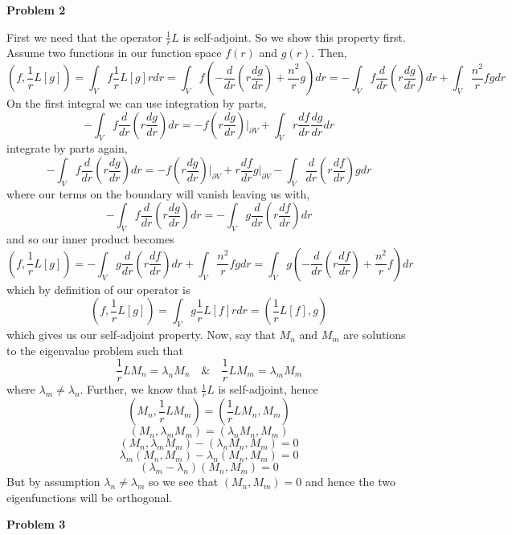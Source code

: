 \documentclass[10pt]{article}
\begin{document}
\newpage
\textbf{Problem 2}

First we need that the operator $\frac{1}{r}L$ is self-adjoint. So we show this property first. Assume two functions in our function space $f(r)$ and $g(r)$. Then,
$$\left(f,\frac{1}{r}L[g]\right) = \int_{V}f\frac{1}{r}L[g]r dr = \int_{V} f \left(-\frac{d}{dr}\left(r\frac{dg}{dr}\right) + \frac{n^{2}}{r}g\right)dr = -\int_{V}f\frac{d}{dr}\left(r\frac{dg}{dr}\right)dr + \int_{V}\frac{n^{2}}{r}fgdr$$
On the first integral we can use integration by parts,
$$-\int_{V}f\frac{d}{dr}\left(r\frac{dg}{dr}\right)dr = -f\left(r\frac{dg}{dr}\right)\biggr\rvert_{\partial V} + \int_{V}r\frac{df}{dr}\frac{dg}{dr}dr$$
integrate by parts again,
$$-\int_{V}f\frac{d}{dr}\left(r\frac{dg}{dr}\right)dr = -f\left(r\frac{dg}{dr}\right)\biggr\rvert_{\partial V} + r\frac{df}{dr}g\biggr\rvert_{\partial V} - \int_{V}\frac{d}{dr}\left(r\frac{df}{dr}\right)gdr$$
where our terms on the boundary will vanish leaving us with,
$$-\int_{V}f\frac{d}{dr}\left(r\frac{dg}{dr}\right)dr=- \int_{V}g\frac{d}{dr}\left(r\frac{df}{dr}\right)dr$$
and so our inner product becomes
$$\left(f,\frac{1}{r}L[g]\right) =-\int_{V}g\frac{d}{dr}\left(r\frac{df}{dr}\right)dr + \int_{V}\frac{n^{2}}{r}fgdr = \int_{V}g\left(-\frac{d}{dr}\left(r\frac{df}{dr}\right) + \frac{n^{2}}{r}f\right)dr$$
which by definition of our operator is
$$\left(f,\frac{1}{r}L[g]\right) = \int_{V}g\frac{1}{r}L[f]rdr = \left(\frac{1}{r}L[f],g\right)$$
which gives us our self-adjoint property. Now, say that $M_{n}$ and $M_{m}$ are solutions to the eigenvalue problem such that
$$\frac{1}{r}LM_{n} = \lambda_{n}M_{n} \hspace{1em} \& \hspace{1em} \frac{1}{r}LM_{m} = \lambda_{m}M_{m}$$
where $\lambda_{m} \neq \lambda_{n}$. Further, we know that $\frac{1}{r}L$ is self-adjoint, hence
$$\left(M_{n},\frac{1}{r}LM_{m}\right) = \left(\frac{1}{r}LM_{n},M_{m}\right)$$
$$\left(M_{n},\lambda_{m}M_{m}\right) = \left(\lambda_{n}M_{n},M_{m}\right)$$
$$(M_{n}, \lambda_{m}M_{m}) - (\lambda_{n}M_{n},M_{m}) = 0$$
$$\lambda_{m}(M_{n},M_{m}) - \lambda_{n}(M_{n},M_{m}) = 0$$
$$(\lambda_{m} - \lambda_{n})(M_{n},M_{m}) = 0$$
But by assumption $\lambda_{n} \neq \lambda_{m}$ so we see that $(M_{n},M_{m}) = 0$ and hence the two eigenfunctions will be orthogonal.

\newpage
\textbf{Problem 3}
\end{document}
